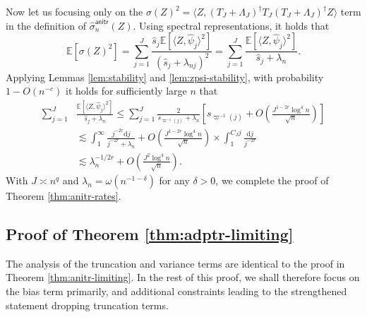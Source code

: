 \documentclass[11pt,a4paper]{article}
\renewcommand{\hat}{\widehat}
\theoremstyle{definition}
\theoremstyle{plain}
\theoremstyle{remark}
\newcommand{\ud}{\mathrm d}
\newcommand{\anitr}{\mathsf{anitr}}
\begin{document}
Now let us focusing only on the $\sigma(Z)^2=\langle Z,(T_J+\Lambda_J)^\dagger T_J (T_J+\Lambda_J)^\dagger Z\rangle$ term in the definition of $\hat\sigma_n^\anitr(Z)$.
Using spectral representations, it holds that
\begin{equation}
\mathbb E[\sigma(Z)^2] = \sum_{j=1}^J \frac{\hat s_j \mathbb E[\langle Z,\hat\psi_j\rangle^2]}{(\hat s_j+\lambda_{nj})^2}
=\sum_{j=1}^J\frac{\mathbb E[\langle Z,\hat\psi_j\rangle^2]}{{\hat s_j}+\lambda_n}.
\label{eq:proof-anitr-rates-1}
\end{equation}
Applying Lemmas \ref{lem:stability} and \ref{lem:zpsi-stability}, with probability $1-O(n^{-c})$ it holds for sufficiently large $n$ that
\begin{align}
\sum_{j=1}^J&\frac{\mathbb E[\langle Z,\hat\psi_j\rangle^2]}{{\hat s_j}+{\lambda_n}}
\leq \sum_{j=1}^J\frac{2}{{s_{\varpi^{-1}(j)}}+\lambda_n}\left[s_{\varpi^{-1}(j)} + O\left(\frac{J^{1-2r}\log^4 n}{\sqrt{n}}\right)\right]\nonumber\\
&\lesssim \int_1^{\infty} \frac{j^{-2r}\ud j}{j^{-2r}+{\lambda_n}} + O\left(\frac{J^{1-2r}\log^4 n}{\sqrt{n}}\right)\times \int_1^{C_J j}\frac{\ud j}{j^{-2r}}\nonumber\\
&\lesssim \lambda_n^{-1/2r} + O\left(\frac{J^2\log^4 n}{\sqrt{n}}\right).
\end{align}
With $J\asymp n^q$ and $\lambda_n=\omega(n^{-1-\delta})$ for any $\delta>0$, we complete the proof of Theorem \ref{thm:anitr-rates}.


\subsection{Proof of Theorem \ref{thm:adptr-limiting}}

The analysis of the truncation and variance terms are identical to the proof in Theorem \ref{thm:anitr-limiting}.
In the rest of this proof, we shall therefore focus on the bias term primarily, and additional constraints leading to the strengthened statement dropping truncation terms.
\end{document}
